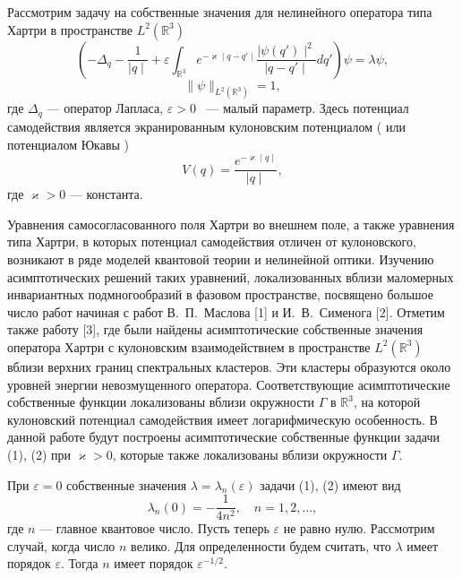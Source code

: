 
\vzmscaption

Рассмотрим задачу на собственные значения для нелинейного
оператора типа Хартри в  пространстве $L^2(\mathbb{R}^3)$
\begin{equation}
( -{\Delta}_q-\frac {1}{\mid q \mid}+ \varepsilon \int_{\mathbb{R}^3}  e^{-\varkappa \mid q-q' \mid}\frac {\mid \psi(q') \mid^2}
{\mid q-q' \mid}dq')\psi=\lambda\psi,
\end{equation}
\begin{equation}
\|\psi\|_{L^2(\mathbb{R}^3)}=1,
\end{equation}
где  ${\Delta}_q $ --- оператор Лапласа, $\varepsilon > 0 $ ~--- малый параметр. Здесь потенциал 
самодействия является экранированным кулоновским потенциалом ( или потенциалом Юкавы  )
$$
V(q)=\frac {e^{-\varkappa \mid q \mid}}{ \mid q \mid},
$$
где $\varkappa > 0 $  --- константа.  

Уравнения самосогласованного поля Хартри во внешнем поле, а также уравнения типа Хартри, в которых потенциал 
самодействия отличен от кулоновского, возникают в ряде моделей квантовой теории и нелинейной оптики.
Изучению асимптотических решений таких уравнений,  локализованных вблизи маломерных
инвариантных подмногообразий в фазовом пространстве, посвящено большое число работ начиная с работ В.~П.~Маслова [1]  и И.~В.~Сименога [2].
Отметим также работу [3], где были найдены асимптотические собственные значения
оператора Хартри  с кулоновским взаимодействием в пространстве $L^2(\mathbb{R}^3)$
вблизи верхних границ спектральных кластеров. Эти кластеры 
образуются около уровней энергии  невозмущенного оператора.  Соответствующие асимптотические собственные функции 
локализованы вблизи окружности   $ \Gamma $ в $\mathbb{R}^3$, на которой кулоновский потенциал самодействия имеет 
логарифмическую особенность.  В данной работе будут 
построены асимптотические собственные функции задачи  (1), (2) при  $\varkappa > 0 $, которые также локализованы вблизи 
окружности $ \Gamma $.  

 При $\varepsilon = 0 $ собственные значения
 $\lambda=\lambda_ n (\varepsilon) $   задачи (1), (2) имеют вид
 $$
\lambda_ n (0)=-\frac {1}{4n^2}, \quad  n=1,2,\dots ,
$$
где $ n $ --- главное квантовое число. Пусть теперь $\varepsilon $ не равно нулю.
 Рассмотрим случай, когда число $n$ велико.
Для определенности будем считать, что $\lambda$ имеет порядок
 $\varepsilon$. Тогда $n$  имеет порядок    $\varepsilon^{-1/2}$.
 
